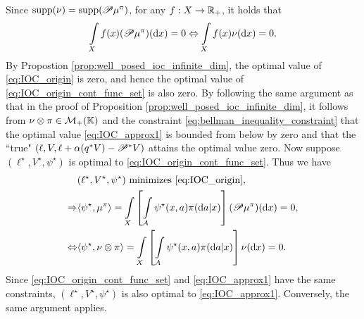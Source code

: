 \begin{pf}
  Since $\operatorname*{supp}(\nu) =\operatorname*{supp}(\mathscr{P}\mu^{\relax{\pi}})$, for any $f:X\rightarrow \mathbb{R}_+$, it holds that
  \begin{align*}
    \int_Xf(x)(\proj\mu^{\pitrue})(\mathrm{d}x) = 0
    \Leftrightarrow\int_Xf(x)\nu(\mathrm{d}x) = 0.
  \end{align*}
  By Propostion \ref{prop:well_posed_ioc_infinite_dim}, the optimal value of \eqref{eq:IOC_origin} is zero, and hence the optimal value of \eqref{eq:IOC_origin_cont_func_set} is also zero. By following the same argument as that in the proof of Proposition \ref{prop:well_posed_ioc_infinite_dim}, it follows from $\nu\otimes\relax{\pi}\in\mathcal{M}_+(\mathbb{K})$ and the constraint \eqref{eq:bellman_inequality_constraint} that the optimal value \eqref{eq:IOC_approx1} is bounded from below by zero and that the ``true" $(\relax{\ell}, \relax{V}, \relax{\ell} +\alpha (q^*\relax{V}) - \mathscr{P}^*\relax{V})$ attains the optimal value zero. Now suppose $(\ell^\star,V^\star, \psi^\star)$ is optimal to \eqref{eq:IOC_origin_cont_func_set}.  Thus we have
  \begin{align*}
    &(\ell^\star,V^\star, \psi^\star) \text{ minimizes \eqref{eq:IOC_origin},}\\
    \Rightarrow&\langle\psi^\star, \mu^{\pitrue}\rangle = \int_X \left[ \int_A \psi^\star(x,a)\pitrue(\mathrm{d}a|x) \right](\proj\mu^{\pitrue})(\mathrm{d}x) = 0, \\
    \Leftrightarrow&\langle\psi^\star,\nu\otimes\pitrue\rangle = \int_X \left[ \int_A \psi^\star(x,a)\pitrue(\mathrm{d}a|x) \right]\nu(\mathrm{d}x) = 0.
  \end{align*}
  Since \eqref{eq:IOC_origin_cont_func_set} and \eqref{eq:IOC_approx1} have the same constraints, $(\ell^\star,V^\star, \psi^\star)$ is also optimal to \eqref{eq:IOC_approx1}. Conversely, the same argument applies.
\end{pf}

